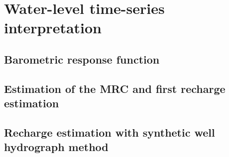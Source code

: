 \documentclass[WHATMANUAL.tex]{subfiles}
\begin{document}
\chapter{Water-level time-series interpretation}

\section{Barometric response function}

\section{Estimation of the MRC and first recharge estimation}

\section{Recharge estimation with synthetic well hydrograph method}
\end{document}
